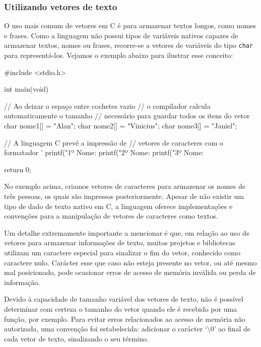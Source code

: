 \subsubsection{Utilizando vetores de texto}

O uso mais comum de vetores em C é para armazenar textos longos, como nomes e 
frases. Como a linguagem não possui tipos de variáveis nativos capazes de 
armazenar textos, nomes ou frases, recorre-se a vetores de variáveis do tipo 
\texttt{char} para representá-los. Vejamos o exemplo abaixo para ilustrar esse 
conceito:

\begin{excode}
    #include <stdio.h>

    int main(void)
    {
        // Ao deixar o espaço entre cochetes vazio
        // o compilador calcula automaticamente o tamanho
        // necessário para guardar todos os itens do vetor
        char nome1[] = "Alan";
        char nome2[] = "Vinicius";
        char nome3[] = "Janiel";

        // A linguagem C prevê a impressão de
        // vetores de caracteres com o formatador '%
        printf("1º Nome: %
        printf("2º Nome: %
        printf("3º Nome: %

        return 0;
    }
\end{excode}

No exemplo acima, criamos vetores de caracteres para armazenar os nomes de três 
pessoas, os quais são impressos posteriormente. Apesar de não existir um tipo 
de dado de texto nativo em C, a linguagem oferece implementações e convenções 
para a manipulação de vetores de caracteres como textos.

Um detalhe extremamente importante a mencionar é que, em relação ao uso de 
vetores para armazenar informações de texto, muitos projetos e bibliotecas 
utilizam um caractere especial para sinalizar o fim do vetor, conhecido como 
caractere nulo. Carácter esse que caso não esteja presente no vetor, ou até 
mesmo mal posicionado, pode ocasionar erros de acesso de memória inválida ou 
perda de informação.

Devido à capacidade de tamanho variável dos vetores de texto, não é possível 
determinar com certeza o tamanho do vetor quando ele é recebido por uma função, 
por exemplo. Para evitar erros relacionados ao acesso de memória não autorizada, 
uma convenção foi estabelecida: adicionar o carácter `\textbackslash0' ao final de cada 
vetor de texto, sinalizando o seu término.


